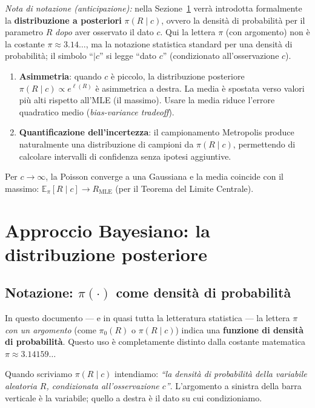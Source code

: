 \documentclass[12pt,a4paper]{article}
\begin{document}
\medskip
\noindent\textit{Nota di notazione (anticipazione):} nella Sezione~\ref{sec:bayes} verrà
introdotta formalmente la \textbf{distribuzione a posteriori} $\pi(R \mid c)$, ovvero
la densità di probabilità per il parametro $R$ \emph{dopo} aver osservato il dato $c$.
Qui la lettera $\pi$ (con argomento) non è la costante $\pi \approx 3.14\ldots$, ma
la notazione statistica standard per una densità di probabilità; il simbolo
``$\mid c$'' si legge ``dato $c$'' (condizionato all'osservazione $c$).

\begin{enumerate}
  \item \textbf{Asimmetria}: quando $c$ è piccolo, la distribuzione posteriore
        $\pi(R \mid c) \propto e^{\ell(R)}$ è asimmetrica a destra. La media è spostata
        verso valori più alti rispetto all'MLE (il massimo). Usare la media riduce
        l'errore quadratico medio (\emph{bias-variance tradeoff}).

  \item \textbf{Quantificazione dell'incertezza}: il campionamento Metropolis produce
        naturalmente una distribuzione di campioni da $\pi(R \mid c)$, permettendo di
        calcolare intervalli di confidenza senza ipotesi aggiuntive.
\end{enumerate}

Per $c \to \infty$, la Poisson converge a una Gaussiana e la media coincide con il
massimo: $\mathbb{E}_{\pi}[R \mid c] \to R_{\mathrm{MLE}}$ (per il Teorema del Limite Centrale).

\section{Approccio Bayesiano: la distribuzione posteriore}
\label{sec:bayes}

\subsection{Notazione: $\pi(\cdot)$ come densità di probabilità}

\begin{osservazione}[title=Disambiguazione: $\pi(\cdot)$ non è la costante $3.14\ldots$]
In questo documento --- e in quasi tutta la letteratura statistica --- la lettera
$\pi$ \emph{con un argomento} (come $\pi_0(R)$ o $\pi(R \mid c)$) indica una
\textbf{funzione di densità di probabilità}. Questo uso è completamente distinto dalla
costante matematica $\pi \approx 3.14159\ldots$

Quando scriviamo $\pi(R \mid c)$ intendiamo: \emph{``la densità di probabilità della
variabile aleatoria $R$, condizionata all'osservazione $c$''}. L'argomento a sinistra
della barra verticale è la variabile; quello a destra è il dato su cui condizioniamo.
\end{osservazione}
\end{document}
